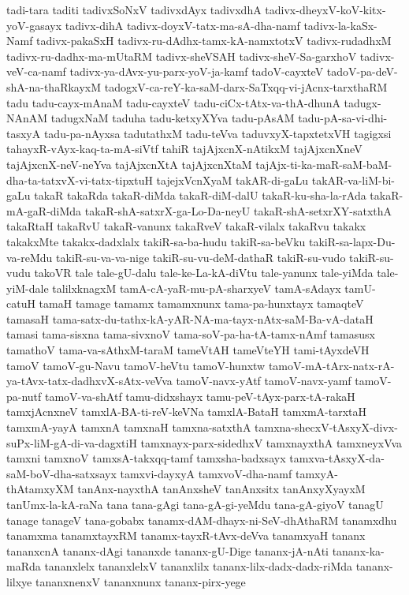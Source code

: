 {tadi-tara
taditi
tadivxSoNxV
tadivxdAyx
tadivxdhA
tadivx-dheyxV-koV-kitx-yoV-gasayx
tadivx-dihA
tadivx-doyxV-tatx-ma-sA-dha-namf
tadivx-la-kaSx-Namf
tadivx-pakaSxH
tadivx-ru-dAdhx-tamx-kA-namxtotxV
tadivx-rudadhxM
tadivx-ru-dadhx-ma-mUtaRM
tadivx-sheVSAH
tadivx-sheV-Sa-garxhoV
tadivx-veV-ca-namf
tadivx-ya-dAvx-yu-parx-yoV-ja-kamf
tadoV-cayxteV
tadoV-pa-deV-shA-na-thaRkayxM
tadogxV-ca-reY-ka-saM-darx-SaTxqq-vi-jAcnx-tarxthaRM
tadu
tadu-cayx-mAnaM
tadu-cayxteV
tadu-ciCx-tAtx-va-thA-dhunA
tadugx-NAnAM
tadugxNaM
taduha
tadu-ketxyXYva
tadu-pAsAM
tadu-pA-sa-vi-dhi-tasxyA
tadu-pa-nAyxsa
tadutathxM
tadu-teVva
taduvxyX-tapxtetxVH
tagigxsi
tahayxR-vAyx-kaq-ta-mA-siVtf
tahiR
tajAjxcnX-nAtikxM
tajAjxcnXneV
tajAjxcnX-neV-neYva
tajAjxcnXtA
tajAjxcnXtaM
tajAjx-ti-ka-maR-saM-baM-dha-ta-tatxvX-vi-tatx-tipxtuH
tajejxVcnXyaM
takAR-di-gaLu
takAR-va-liM-bi-gaLu
takaR
takaRda
takaR-diMda
takaR-diM-dalU
takaR-ku-sha-la-rAda
takaR-mA-gaR-diMda
takaR-shA-satxrX-ga-Lo-Da-neyU
takaR-shA-setxrXY-satxthA
takaRtaH
takaRvU
takaR-vanunx
takaRveV
takaR-vilalx
takaRvu
takakx
takakxMte
takakx-dadxlalx
takiR-sa-ba-hudu
takiR-sa-beVku
takiR-sa-lapx-Du-va-reMdu
takiR-su-va-va-nige
takiR-su-vu-deM-dathaR
takiR-su-vudo
takiR-su-vudu
takoVR
tale
tale-gU-dalu
tale-ke-La-kA-diVtu
tale-yanunx
tale-yiMda
tale-yiM-dale
talilxknagxM
tamA-cA-yaR-mu-pA-sharxyeV
tamA-sAdayx
tamU-catuH
tamaH
tamage
tamamx
tamamxnunx
tama-pa-hunxtayx
tamaqteV
tamasaH
tama-satx-du-tathx-kA-yAR-NA-ma-tayx-nAtx-saM-Ba-vA-dataH
tamasi
tama-sisxna
tama-sivxnoV
tama-soV-pa-ha-tA-tamx-nAmf
tamasusx
tamathoV
tama-va-sAthxM-taraM
tameVtAH
tameVteYH
tami-tAyxdeVH
tamoV
tamoV-gu-Navu
tamoV-heVtu
tamoV-hunxtw
tamoV-mA-tArx-natx-rA-ya-tAvx-tatx-dadhxvX-sAtx-veVva
tamoV-navx-yAtf
tamoV-navx-yamf
tamoV-pa-nutf
tamoV-va-shAtf
tamu-didxshayx
tamu-peV-tAyx-parx-tA-rakaH
tamxjAcnxneV
tamxlA-BA-ti-reV-keVNa
tamxlA-BataH
tamxmA-tarxtaH
tamxmA-yayA
tamxnA
tamxnaH
tamxna-satxthA
tamxna-shecxV-tAsxyX-divx-suPx-liM-gA-di-va-dagxtiH
tamxnayx-parx-sidedhxV
tamxnayxthA
tamxneyxVva
tamxni
tamxnoV
tamxsA-takxqq-tamf
tamxsha-badxsayx
tamxva-tAsxyX-da-saM-boV-dha-satxsayx
tamxvi-dayxyA
tamxvoV-dha-namf
tamxyA-thAtamxyXM
tanAnx-nayxthA
tanAnxsheV
tanAnxsitx
tanAnxyXyayxM
tanUmx-la-kA-raNa
tana
tana-gAgi
tana-gA-gi-yeMdu
tana-gA-giyoV
tanagU
tanage
tanageV
tana-gobabx
tanamx-dAM-dhayx-ni-SeV-dhAthaRM
tanamxdhu
tanamxma
tanamxtayxRM
tanamx-tayxR-tAvx-deVva
tanamxyaH
tananx
tananxcnA
tananx-dAgi
tananxde
tananx-gU-Dige
tananx-jA-nAti
tananx-ka-maRda
tananxlelx
tananxlelxV
tananxlilx
tananx-lilx-dadx-dadx-riMda
tananx-lilxye
tananxnenxV
tananxnunx
tananx-pirx-yege
}
